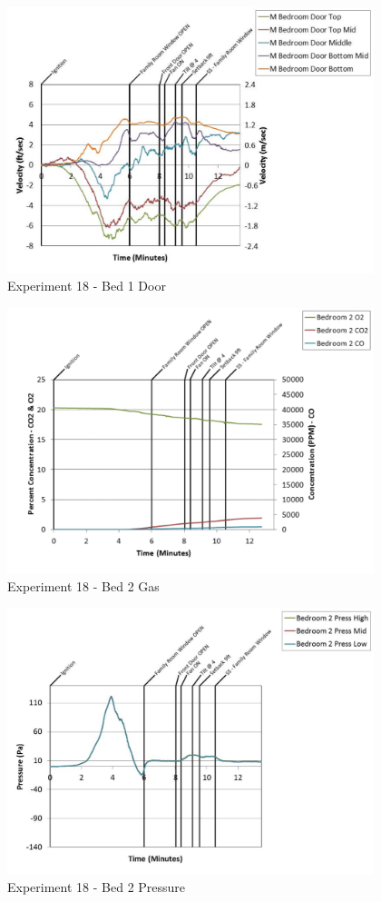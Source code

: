 \documentclass{article}
\begin{document}
\begin{appendices}
	\clearpage

	\begin{figure}[h!]
		\centering
		\includegraphics[height=3.05in]{0_Images/Results_Charts/Exp_18_Charts/Bed1Door.pdf}
		\caption{Experiment 18 - Bed 1 Door}
	\end{figure}
 

	\begin{figure}[h!]
		\centering
		\includegraphics[height=3.05in]{0_Images/Results_Charts/Exp_18_Charts/Bed2Gas.pdf}
		\caption{Experiment 18 - Bed 2 Gas}
	\end{figure}
 
	\clearpage

	\begin{figure}[h!]
		\centering
		\includegraphics[height=3.05in]{0_Images/Results_Charts/Exp_18_Charts/Bed2Pressure.pdf}
		\caption{Experiment 18 - Bed 2 Pressure}
	\end{figure}
 


\end{appendices}
\end{document}
